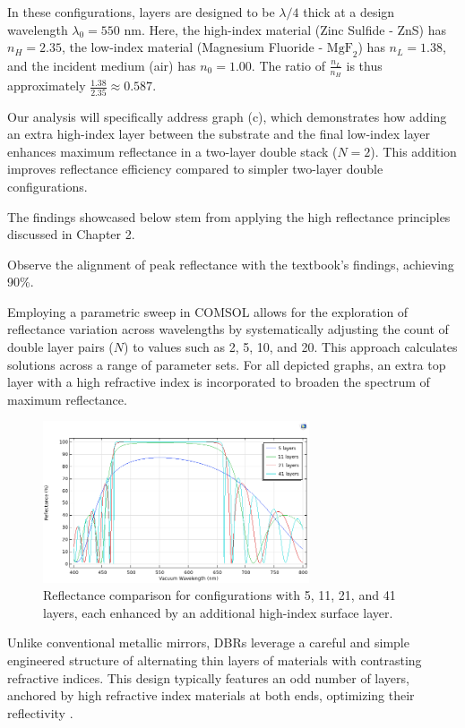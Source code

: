 In these configurations, layers are designed to be $\lambda/4$ thick at a design wavelength $\lambda_0 = 550$ nm. Here, the high-index material (Zinc Sulfide - ZnS) has $n_H = 2.35$, the low-index material (Magnesium Fluoride - $\text{MgF}_2$) has $n_L = 1.38$, and the incident medium (air) has $n_0 = 1.00$. The ratio of $\frac{n_L}{n_H}$ is thus approximately $\frac{1.38}{2.35} \approx 0.587$.

Our analysis will specifically address graph (c), which demonstrates how adding an extra high-index layer between the substrate and the final low-index layer enhances maximum reflectance in a two-layer double stack ($N = 2$). This addition improves reflectance efficiency compared to simpler two-layer double configurations.

The findings showcased below stem from applying the high reflectance principles discussed in Chapter 2.

Observe the alignment of peak reflectance with the textbook's findings, achieving 90\%.

Employing a parametric sweep in COMSOL allows for the exploration of reflectance variation across wavelengths by systematically adjusting the count of double layer pairs ($N$) to values such as 2, 5, 10, and 20. This approach calculates solutions across a range of parameter sets. For all depicted graphs, an extra top layer with a high refractive index is incorporated to broaden the spectrum of maximum reflectance.

\begin{figure}[H]
  \centering
  \includegraphics[width=0.7\textwidth]{Chapters/Figures/Chapter 4 Figures/High-Reflectance (5, 11, 21, and 41 Layers).png}
  \caption{Reflectance comparison for configurations with 5, 11, 21, and 41 layers, each enhanced by an additional high-index surface layer.}
  \label{fig:COMSOL multi-layer reflectance results}
\end{figure}

Unlike conventional metallic mirrors, DBRs leverage a careful and simple engineered structure of alternating thin layers of materials with contrasting refractive indices. This design typically features an odd number of layers, anchored by high refractive index materials at both ends, optimizing their reflectivity \cite{multiphysics__distributed_nodate}.

